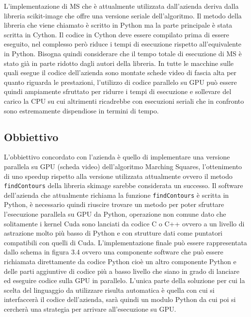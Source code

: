 \documentclass[12pt,a4paper]{report}
\begin{document}
L’implementazione di MS che è attualmente utilizzata dall’azienda deriva dalla libreria scikit-image che offre una versione seriale dell’algoritmo. Il metodo della libreria che viene chiamato è scritto in Python ma la parte principale è stata scritta in Cython.
Il codice in Cython deve essere compilato prima di essere eseguito, nel complesso però riduce i tempi di esecuzione rispetto all’equivalente in Python. Bisogna quindi considerare che il tempo totale di esecuzione di MS è stato già in parte ridotto dagli autori della libreria. \newline
In tutte le macchine sulle quali esegue il codice dell'azienda sono montate schede video di fascia alta per quanto riguarda le prestazioni, l'utilizzo di codice parallelo su GPU può essere quindi ampiamente sfruttato per ridurre i tempi di esecuzione e sollevare del carico la CPU su cui altrimenti ricadrebbe con esecuzioni seriali che in confronto sono estremamente dispendiose in termini di tempo.

\subsection{Obbiettivo}
L'obbiettivo concordato con l'azienda è quello di implementare una versione parallela su GPU (scheda video) dell'algoritmo Marching Squares, l'ottenimento di uno speedup rispetto alla versione utilizzata attualmente ovvero il metodo \verb|findContours| della libreria skimage sarebbe considerata un successo. \newline
Il software dell'azienda che attualmente richiama la funzione \verb|findContours| è scritta in Python, è necessario quindi riuscire trovare un metodo per poter sfruttare l'esecuzione parallela su GPU da Python, operazione non comune dato che solitamente i kernel Cuda sono lanciati da codice C o C++ ovvero a un livello di astrazione molto più basso di Python e con strutture dati come puntatori compatibili con quelli di Cuda. \newline
L'implementazione finale può essere rappresentata dallo schema in figura 3.4 ovvero una componente software che può essere richiamata direttamente da codice Python cioè un altro componente Python e delle parti aggiuntive di codice più a basso livello che siano in grado di lanciare ed eseguire codice sulla GPU in parallelo. L'unica parte della soluzione per cui la scelta del linguaggio da utilizzare risulta automatica è quella con cui si interfaccerà il codice dell'azienda, sarà quindi un modulo Python da cui poi si cercherà una strategia per arrivare all'esecuzione su GPU. \newline
\end{document}
